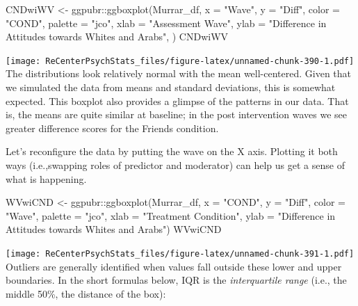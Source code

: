 \documentclass[
  11pt,
]{book}
\newenvironment{Shaded}{\begin{snugshade}}{\end{snugshade}}
\newcommand{\AttributeTok}[1]{\textcolor[rgb]{0.77,0.63,0.00}{#1}}
\newcommand{\FunctionTok}[1]{\textcolor[rgb]{0.00,0.00,0.00}{#1}}
\newcommand{\NormalTok}[1]{#1}
\newcommand{\OtherTok}[1]{\textcolor[rgb]{0.56,0.35,0.01}{#1}}
\newcommand{\SpecialCharTok}[1]{\textcolor[rgb]{0.00,0.00,0.00}{#1}}
\newcommand{\StringTok}[1]{\textcolor[rgb]{0.31,0.60,0.02}{#1}}
\begin{document}
\begin{Shaded}
\begin{Highlighting}[]
\NormalTok{CNDwiWV }\OtherTok{\textless{}{-}}\NormalTok{ ggpubr}\SpecialCharTok{::}\FunctionTok{ggboxplot}\NormalTok{(Murrar\_df, }\AttributeTok{x =} \StringTok{"Wave"}\NormalTok{, }\AttributeTok{y =} \StringTok{"Diff"}\NormalTok{, }\AttributeTok{color =} \StringTok{"COND"}\NormalTok{,}
    \AttributeTok{palette =} \StringTok{"jco"}\NormalTok{, }\AttributeTok{xlab =} \StringTok{"Assessment Wave"}\NormalTok{, }\AttributeTok{ylab =} \StringTok{"Difference in Attitudes towards Whites and Arabs"}\NormalTok{,}
\NormalTok{    )}
\NormalTok{CNDwiWV}
\end{Highlighting}
\end{Shaded}

\texttt{[image: ReCenterPsychStats\_files/figure-latex/unnamed-chunk-390-1.pdf]}
The distributions look relatively normal with the mean well-centered. Given that we simulated the data from means and standard deviations, this is somewhat expected. This boxplot also provides a glimpse of the patterns in our data. That is, the means are quite similar at baseline; in the post intervention waves we see greater difference scores for the Friends condition.

Let's reconfigure the data by putting the wave on the X axis. Plotting it both ways (i.e.,swapping roles of predictor and moderator) can help us get a sense of what is happening.

\begin{Shaded}
\begin{Highlighting}[]
\NormalTok{WVwiCND }\OtherTok{\textless{}{-}}\NormalTok{ ggpubr}\SpecialCharTok{::}\FunctionTok{ggboxplot}\NormalTok{(Murrar\_df, }\AttributeTok{x =} \StringTok{"COND"}\NormalTok{, }\AttributeTok{y =} \StringTok{"Diff"}\NormalTok{, }\AttributeTok{color =} \StringTok{"Wave"}\NormalTok{,}
    \AttributeTok{palette =} \StringTok{"jco"}\NormalTok{, }\AttributeTok{xlab =} \StringTok{"Treatment Condition"}\NormalTok{, }\AttributeTok{ylab =} \StringTok{"Difference in Attitudes towards Whites and Arabs"}\NormalTok{)}
\NormalTok{WVwiCND}
\end{Highlighting}
\end{Shaded}

\texttt{[image: ReCenterPsychStats\_files/figure-latex/unnamed-chunk-391-1.pdf]}
Outliers are generally identified when values fall outside these lower and upper boundaries. In the short formulas below, IQR is the \emph{interquartile range} (i.e., the middle 50\%, the distance of the box):
\end{document}
